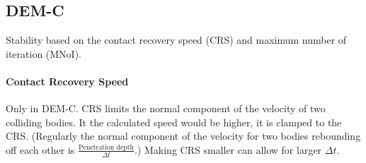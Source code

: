 \documentclass{book}
\begin{document}
\subsection{DEM-C}
Stability based on the contact recovery speed (CRS) and maximum number of iteration (MNoI).
\paragraph{Contact Recovery Speed} Only in DEM-C. CRS limits the normal component of the velocity of two colliding bodies. It the calculated speed would be higher, it is clamped to the CRS. (Regularly the normal component of the velocity for two bodies rebounding off each other is $\frac{\text{Penetration depth}}{\Delta t}$.) Making CRS smaller can allow for larger $\Delta t$.
\end{document}
